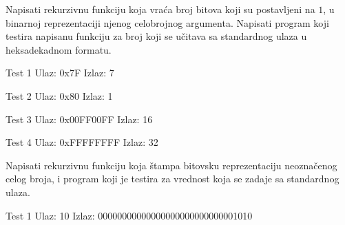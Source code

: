 
\begin{Exercise}[label=103]
Napisati rekurzivnu funkciju koja vraća broj bitova koji su postavljeni na $1$, 
u binarnoj reprezentaciji njenog celobrojnog argumenta.  
Napisati program koji testira napisanu funkciju za broj koji se učitava sa 
standardnog ulaza u heksadekadnom formatu. 


\begin{minitest}
\begin{test}{Test 1}
Ulaz:  0x7F    
Izlaz:  7             
\end{test}
\end{minitest}
\begin{minitest}
\begin{test}{Test 2}
Ulaz:  0x80
Izlaz:  1         
\end{test}
\end{minitest}
\begin{minitest}
\begin{test}{Test 3}
Ulaz:   0x00FF00FF
Izlaz:  16
\end{test}
\end{minitest}

\begin{minitest}
\begin{test}{Test 4}
Ulaz:   0xFFFFFFFF       
Izlaz:  32
\end{test}
\end{minitest}  

\end{Exercise}
\begin{Answer}[ref=103]
\end{Answer}

\begin{Exercise}[label=115]%
Napisati rekurzivnu funkciju koja štampa bitovsku
  reprezentaciju neoznačenog celog broja, i program koji je
  testira za vrednost koja se zadaje sa standardnog ulaza.

\begin{maxitest}
\begin{test}{Test 1}
Ulaz:       10                                 
Izlaz:      00000000000000000000000000001010                    
\end{test}
\end{maxitest}
\end{Exercise}

